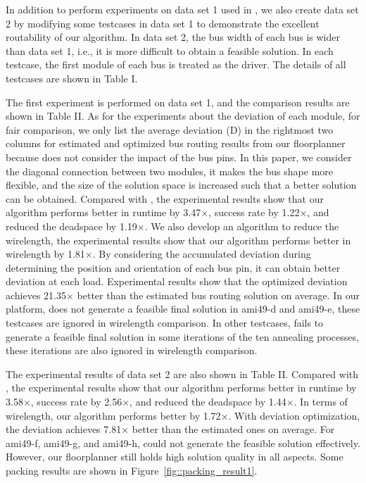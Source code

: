 In addition to perform experiments on data set 1 used in \cite{Ma08},
we also create data set 2 by modifying some testcases in data set 1 to
demonstrate the excellent routability of our algorithm. In data set
2, the bus width of each bus is wider than data set 1, i.e., it is more
difficult to obtain a feasible solution.
In each testcase, the first module of each bus is treated as the driver.
The details of all testcases are shown in Table I.

The first experiment is performed on data set 1, and the comparison results
are shown in Table II. As for the experiments about the
deviation of each module, for fair comparison, we only list the
average deviation (D) in the rightmost two columns for estimated and
optimized bus routing results from our floorplanner because
\cite{Ma08} does not consider the impact of the bus pins.
In this paper, we consider the diagonal connection
between two modules, it makes the bus shape more flexible, and the
size of the solution space is increased such that a better solution
can be obtained. Compared with \cite{Ma08}, the experimental
results show that our algorithm performs better in runtime by
3.47$\times$, success rate by 1.22$\times$, and reduced the
deadspace by 1.19$\times$. We also develop an algorithm to
reduce the wirelength, the experimental results show that our algorithm
performs better in wirelength by 1.81$\times$. By considering the
accumulated deviation during determining the position and
orientation of each bus pin, it can obtain better deviation at each load.
Experimental results show that the optimized deviation achieves 21.35$\times$
better than the estimated bus routing solution on average.
In our platform, \cite{Ma08}
does not generate a feasible final solution in ami49-d
and ami49-e, these testcases are ignored in wirelength
comparison. In other testcases, \cite{Ma08} fails to generate a
feasible final solution in some iterations of the ten annealing
processes, these iterations are also ignored in wirelength
comparison.

The experimental results of data set 2 are also shown in Table II.
Compared with \cite{Ma08}, the experimental results show that our
algorithm performs better in runtime by 3.58$\times$, success rate
by 2.56$\times$, and reduced the deadspace by 1.44$\times$. In
terms of wirelength, our algorithm performs better by 1.72$\times$.
With deviation optimization, the deviation achieves 7.81$\times$ better
than the estimated ones on average.
For ami49-f, ami49-g, and ami49-h, \cite{Ma08} could
not generate the feasible solution effectively. However, our
floorplanner still holds high solution quality in all aspects.
Some packing results are shown in Figure~\ref{fig::packing_result1}.


